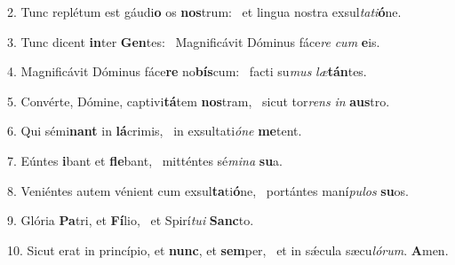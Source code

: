2. Tunc replétum est gáudi\textbf{o} os \textbf{nos}trum: \ast\  et lingua nostra exsul\textit{ta}\textit{ti}\textbf{ó}ne.\

3. Tunc dicent \textbf{in}ter \textbf{Gen}tes: \ast\  Magnificávit Dóminus fáce\textit{re} \textit{cum} \textbf{e}is.\

4. Magnificávit Dóminus fáce\textbf{re} no\textbf{bís}cum: \ast\  facti su\textit{mus} \textit{læ}\textbf{tán}tes.\

5. Convérte, Dómine, captivi\textbf{tá}tem \textbf{nos}tram, \ast\  sicut tor\textit{rens} \textit{in} \textbf{aus}tro.\

6. Qui sémi\textbf{nant} in \textbf{lá}crimis, \ast\  in exsultati\textit{ó}\textit{ne} \textbf{me}tent.\

7. Eúntes \textbf{i}bant et \textbf{fle}bant, \ast\  mitténtes sé\textit{mi}\textit{na} \textbf{su}a.\

8. Veniéntes autem vénient cum exsul\textbf{ta}ti\textbf{ó}ne, \ast\  portántes maní\textit{pu}\textit{los} \textbf{su}os.\

9. Glória \textbf{Pa}tri, et \textbf{Fí}lio, \ast\  et Spirí\textit{tu}\textit{i} \textbf{Sanc}to.\

10. Sicut erat in princípio, et \textbf{nunc}, et \textbf{sem}per, \ast\  et in sǽcula sæcu\textit{ló}\textit{rum}. \textbf{A}men.\

